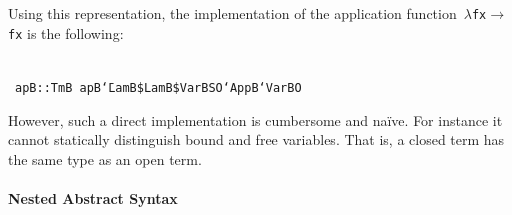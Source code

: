\documentclass[9pt,authoryear]{sigplanconf}
\begin{document}
%
Using this representation, the implementation of the application
    function{~}\texttt{$ \lambda $}\texttt{\mbox{\hspace{0.50em}}}\texttt{f}\texttt{\mbox{\hspace{0.50em}}}\texttt{x}\texttt{\mbox{\hspace{0.50em}}}\texttt{$ \rightarrow $}\texttt{\mbox{\hspace{0.50em}}}\texttt{f}\texttt{\mbox{\hspace{0.50em}}}\texttt{x} is the following{:}%


{\nopagebreak }

%
%
%
~\\~\vphantom{$\{$}\texttt{apB}\texttt{\mbox{\hspace{0.50em}}}\texttt{{:}{:}}\texttt{\mbox{\hspace{0.50em}}}\texttt{TmB}\texttt{{\nopagebreak \newline%
}\vphantom{$\{$}}\texttt{apB}\texttt{\mbox{\hspace{0.50em}}}\texttt{{\char `\=}}\texttt{\mbox{\hspace{0.50em}}}\texttt{LamB}\texttt{\mbox{\hspace{0.50em}}}\texttt{\${}}\texttt{\mbox{\hspace{0.50em}}}\texttt{LamB}\texttt{\mbox{\hspace{0.50em}}}\texttt{\${}}\texttt{\mbox{\hspace{0.50em}}}\texttt{VarB}\texttt{\mbox{\hspace{0.50em}}}\texttt{\makebox[1.22ex][l]{$ {(} $}}\texttt{S}\texttt{\mbox{\hspace{0.50em}}}\texttt{O}\texttt{\makebox[1.22ex][r]{$ {)} $}}\texttt{\mbox{\hspace{0.50em}}}\texttt{{`}AppB{`}}\texttt{\mbox{\hspace{0.50em}}}\texttt{VarB}\texttt{\mbox{\hspace{0.50em}}}\texttt{O}\texttt{{\nopagebreak \newline%
}\vphantom{$\{$}}%


%
However, such a direct implementation is cumbersome and na\"{i}ve. For
    instance it cannot statically distinguish bound and free variables.
    That is, a closed term has the same type as an open term.%


\paragraph*{Nested Abstract Syntax}
\end{document}
